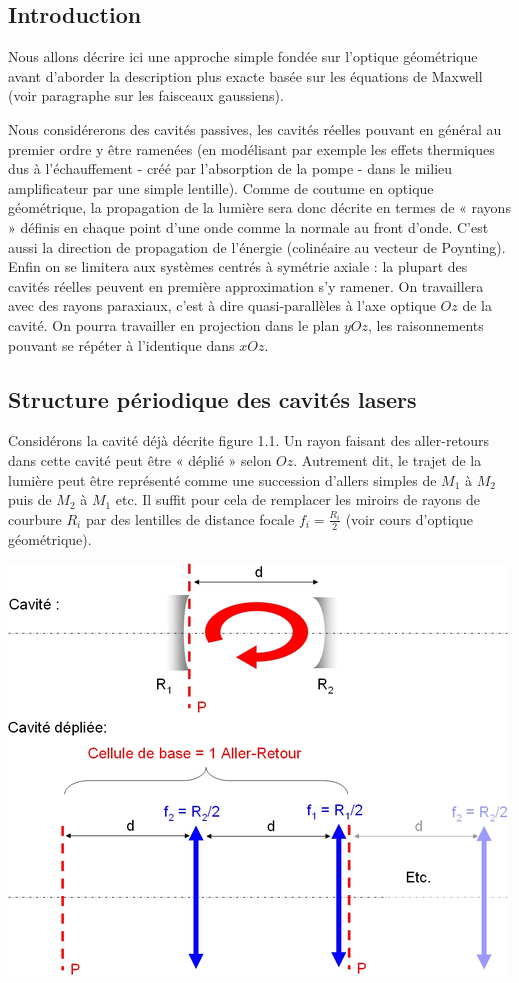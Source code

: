 \documentclass{book}
\begin{document}
\subsection{Introduction}
Nous allons décrire ici une approche simple fondée sur l'optique géométrique avant d'aborder la description plus exacte basée sur les équations de Maxwell (voir paragraphe sur les faisceaux gaussiens). 

Nous considérerons des cavités passives, les cavités réelles pouvant en général au premier ordre y être ramenées (en modélisant par exemple les effets thermiques dus à l'échauffement - créé par l'absorption de la pompe - dans le milieu amplificateur par une simple lentille). Comme de coutume en optique géométrique, la propagation de la lumière sera donc décrite en termes de « rayons » définis en chaque point d'une onde comme la normale au front d'onde. C'est aussi la direction de propagation de l'énergie (colinéaire au vecteur de Poynting). Enfin on se limitera aux systèmes centrés à symétrie axiale : la plupart des cavités réelles peuvent en première approximation s'y ramener. On travaillera avec des rayons paraxiaux, c'est à dire quasi-parallèles à l'axe optique $Oz$ de la cavité. On pourra travailler en projection dans le plan $yOz$, les raisonnements pouvant se répéter à l'identique dans $xOz$.

\subsection{Structure périodique des cavités lasers}
Considérons la cavité déjà décrite figure 1.1. Un rayon faisant des aller-retours dans cette cavité peut être « déplié » selon $Oz$. Autrement dit, le trajet de la lumière peut être représenté comme une succession d'allers simples de $M_1$ à $M_2$ puis de $M_2$ à $M_1$ etc. Il suffit pour cela de remplacer les miroirs de rayons de courbure $R_i$ par des lentilles de distance focale $f_i=\frac {R_i} 2$ (voir cours d'optique géométrique). 

{\centering
\includegraphics[scale=1.7]{images/fig04.jpg}
\par}
\end{document}
